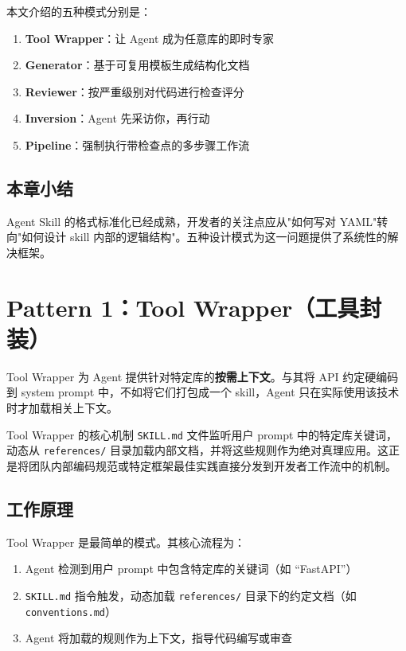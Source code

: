 \documentclass[a4paper]{article}
\begin{document}
本文介绍的五种模式分别是：
\begin{enumerate}
    \item \textbf{Tool Wrapper}：让 Agent 成为任意库的即时专家
    \item \textbf{Generator}：基于可复用模板生成结构化文档
    \item \textbf{Reviewer}：按严重级别对代码进行检查评分
    \item \textbf{Inversion}：Agent 先采访你，再行动
    \item \textbf{Pipeline}：强制执行带检查点的多步骤工作流
\end{enumerate}

\subsection{本章小结}

Agent Skill 的格式标准化已经成熟，开发者的关注点应从"如何写对 YAML"转向"如何设计 skill 内部的逻辑结构"。五种设计模式为这一问题提供了系统性的解决框架。

\section{Pattern 1：Tool Wrapper（工具封装）}

Tool Wrapper 为 Agent 提供针对特定库的\textbf{按需上下文}。与其将 API 约定硬编码到 system prompt 中，不如将它们打包成一个 skill，Agent 只在实际使用该技术时才加载相关上下文。

\begin{importantbox}{Tool Wrapper 的核心机制}
\texttt{SKILL.md} 文件监听用户 prompt 中的特定库关键词，动态从 \texttt{references/} 目录加载内部文档，并将这些规则作为绝对真理应用。这正是将团队内部编码规范或特定框架最佳实践直接分发到开发者工作流中的机制。
\end{importantbox}

\subsection{工作原理}

Tool Wrapper 是最简单的模式。其核心流程为：

\begin{enumerate}
    \item Agent 检测到用户 prompt 中包含特定库的关键词（如 ``FastAPI''）
    \item \texttt{SKILL.md} 指令触发，动态加载 \texttt{references/} 目录下的约定文档（如 \texttt{conventions.md}）
    \item Agent 将加载的规则作为上下文，指导代码编写或审查
\end{enumerate}
\end{document}
